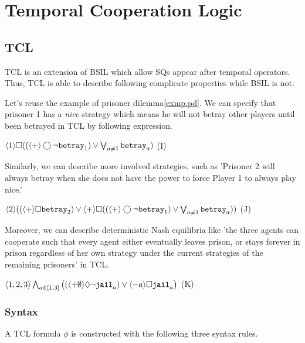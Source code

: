 \chapter{Temporal Cooperation Logic}
\section{TCL}
TCL is an extension of BSIL which allow SQs appear after temporal operators.
Thus, TCL is able to describe following complicate properties while BSIL is not.

Let's reuse the example of prisoner dilemma\ref{exmp.pd}.
We can specify that prisoner 1 has a {\em nice} strategy which means he will not betray other players until been betrayed in TCL by following expression.
\begin{center} 
\hfill 
$\langle 1\rangle \Box ((\langle+\rangle \bigcirc \neg\mbox{\tt betray}_1)
\vee \bigvee_{a\neq 1}\mbox{\tt betray}_a)$
\hfill (I) 
\end{center}

Similarly, we can describe more involved strategies, such as 'Prisoner 2 will always betray when she does not have the power to force Player 1 to always play nice.'
\begin{center} 
\hfill 
$\langle 2\rangle (
(\langle+\rangle \Box \mbox{\tt betray}_2) 
\vee \langle+\rangle\Box ((\langle+\rangle \bigcirc \neg\mbox{\tt betray}_1)
\vee \bigvee_{a\neq 1}\mbox{\tt betray}_a))$
\hfill (J) 
\end{center} 

Moreover, we can describe deterministic Nash equilibria like 'the three agents can cooperate such that every agent either eventually leaves prison, or stays forever in prison regardless of her own strategy under the current strategies of the remaining prisoners' in TCL.
\begin{center}
\hfill
$\langle 1,2,3\rangle
        \bigwedge_{a\in [1,3]}\big((
        \langle+\emptyset\rangle\Diamond \neg \mbox{\tt jail}_a) \vee
        \langle-a\rangle \Box \mbox{\tt jail}_a\big)$
\hfill (K)
\end{center}


\subsection{Syntax}
A TCL formula $\phi$ is constructed with the following three syntax rules.
\smallskip

